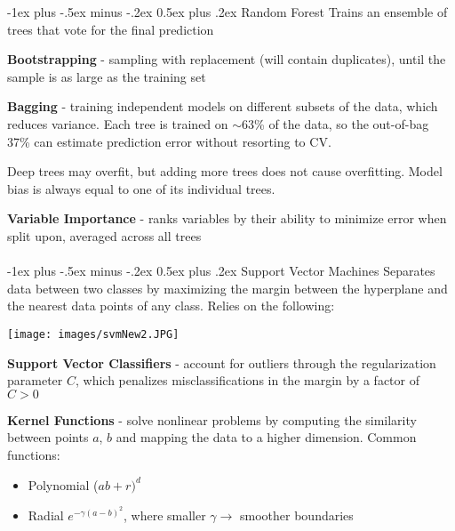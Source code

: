 \documentclass[10pt,landscape]{article}
\makeatletter
\renewcommand{\section}{\@startsection{section}{1}{0mm}%
                                {-1ex plus -.5ex minus -.2ex}%
                                {0.5ex plus .2ex}%
                                {\normalfont\large\bfseries}}
\renewcommand{\subsection}{\@startsection{subsection}{2}{0mm}%
                                {-1ex plus -.5ex minus -.2ex}%
                                {0.5ex plus .2ex}%
                                {\normalfont\normalsize\bfseries}}
\makeatother
\begin{document}
\begin{multicols}{3}
\subsection{Random Forest}
Trains an ensemble of trees that vote for the final prediction

\textbf{Bootstrapping} - sampling with replacement (will contain duplicates), until the sample is as large as the training set

\textbf{Bagging} - training independent models on different subsets of the data, which reduces variance. Each tree is trained on $\sim$63\% of the data, so the out-of-bag 37\% can estimate prediction error without resorting to CV.

Deep trees may overfit, but adding more trees does not cause overfitting. Model bias is always equal to one of its individual trees.

\textbf{Variable Importance} - ranks variables by their ability to minimize error when split upon, averaged across all trees
\columnbreak
\\\textcolor{white}{.}\vspace{-5mm}\\ %

\section{Support Vector Machines}
Separates data between two classes by maximizing the margin between the hyperplane and the nearest data points of any class. Relies on the following:
\vspace{-2.5mm}
\begin{center}
    \texttt{[image: images/svmNew2.JPG]}
\end{center}
\vspace{-2mm}
\textbf{Support Vector Classifiers} - account for outliers through the regularization parameter $C$, which penalizes misclassifications in the margin by a factor of $C > 0$

\textbf{Kernel Functions} - solve nonlinear problems by computing the similarity between points $a$, $b$ and mapping the data to a higher dimension. Common functions:
\begin{itemize}[label={--},leftmargin=4mm]
\vspace{-1mm}
\itemsep -.4mm
\item Polynomial ($ab + r)^d$
\item Radial $e^{-\gamma(a-b)^2}$, where smaller $\gamma \to$  smoother boundaries
\end{itemize}


\end{multicols}
\end{document}
